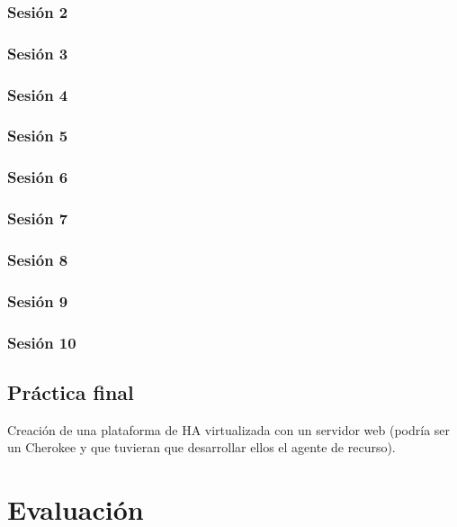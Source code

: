 \documentclass[a4paper]{article}
\begin{document}
      \subsubsection{Sesión 2}
      \subsubsection{Sesión 3}
      \subsubsection{Sesión 4}
      \subsubsection{Sesión 5}
      \subsubsection{Sesión 6}
      \subsubsection{Sesión 7}
      \subsubsection{Sesión 8}
      \subsubsection{Sesión 9}
      \subsubsection{Sesión 10}

    \subsection{Práctica final}
      Creación de una plataforma de HA virtualizada con un servidor web (podría ser un Cherokee y que tuvieran que desarrollar ellos el agente de recurso).
      

  \section{Evaluación}
\end{document}
